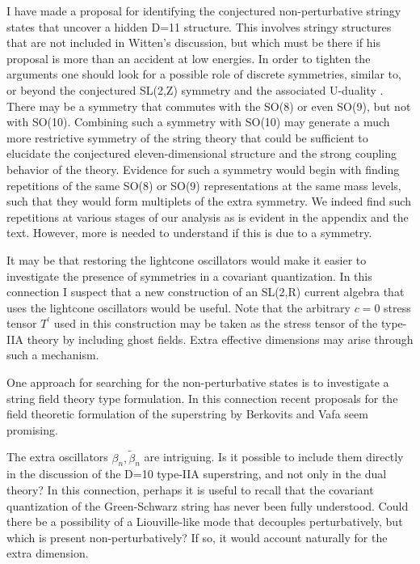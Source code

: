 I have made a proposal for identifying the conjectured non-perturbative
stringy states that uncover a hidden D=11 structure. This involves stringy
structures that are not included in Witten's discussion, but which must be
there if his proposal is more than an accident at low energies. In order to
tighten the arguments one should look for a possible role of discrete
symmetries, similar to, or beyond the conjectured SL(2,Z) symmetry and the
associated U-duality \cite{hulltowns}. There may be a symmetry that commutes
with the SO(8) or even SO(9), but not with SO(10). Combining such a symmetry
with SO(10) may generate a much more restrictive symmetry of the string
theory that could be sufficient to elucidate the conjectured
eleven-dimensional structure and the strong coupling behavior of the theory.
Evidence for such a symmetry would begin with finding repetitions of the
same SO(8) or SO(9) representations at the same mass levels, such that they
would form multiplets of the extra symmetry. We indeed find such repetitions
at various stages of our analysis as is evident in the appendix and the
text. However, more is needed to understand if this is due to a symmetry.

It may be that restoring the lightcone oscillators would make it easier to
investigate the presence of symmetries in a covariant quantization. In this
connection I suspect that a new construction of an SL(2,R) current algebra
that uses the lightcone oscillators \cite{ibsl2wzw} would be useful. Note
that the arbitrary $c=0$ stress tensor $T^{\prime }$ used in this
construction may be taken as the stress tensor of the type-IIA theory by
including ghost fields. Extra effective dimensions may arise through such a
mechanism.

One approach for searching for the non-perturbative states is to investigate
a string field theory type formulation. In this connection recent proposals
for the field theoretic formulation of the superstring by Berkovits and Vafa
seem promising\cite{bv}.

The extra oscillators $\beta _n,\tilde \beta _n$ are intriguing. Is it
possible to include them directly in the discussion of the D=10 type-IIA
superstring, and not only in the dual theory? In this connection, perhaps it
is useful to recall that the covariant quantization of the Green-Schwarz
string has never been fully understood. Could there be a possibility of a
Liouville-like mode that decouples perturbatively, but which is present
non-perturbatively? If so, it would account naturally for the extra
dimension.

